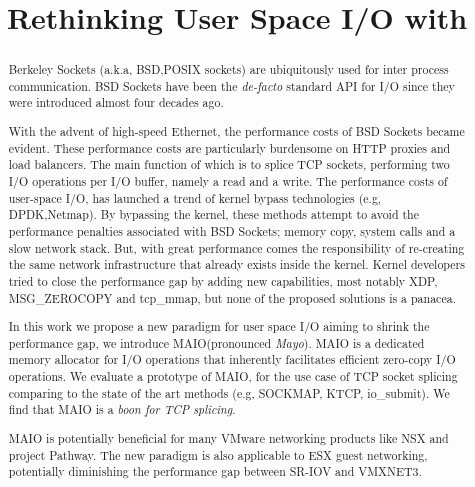 \documentclass[sigconf,9pt]{acmart}
\title{Rethinking User Space I/O with \oursys}
\newcommand{\oursys}{MAIO\xspace}
\newcommand{\sockets}{BSD Sockets\xspace}
\begin{document}
\begin{abstract}
    Berkeley Sockets (a.k.a, BSD,POSIX sockets) are ubiquitously used for inter process communication. \sockets have been the \emph{de-facto} standard API for I/O since they were introduced almost four decades ago. 
    
    With the advent of high-speed Ethernet, the performance costs of \sockets became evident. These performance costs are particularly burdensome on HTTP proxies and load balancers. The main function of which is to splice TCP sockets, performing two I/O operations per I/O buffer, namely a read and a write. The performance costs of user-space I/O, has launched a trend of kernel bypass technologies (e.g, DPDK,Netmap). By bypassing the kernel, these methods attempt to avoid the performance penalties associated with \sockets; memory copy, system calls and a slow network stack. But, with great performance comes the responsibility of re-creating the same network infrastructure that already exists inside the kernel. Kernel developers tried to close the performance gap by adding new capabilities, most notably XDP, MSG\_ZEROCOPY and tcp\_mmap, but none of the proposed solutions is a panacea.
    
    In this work we propose a new paradigm for user space I/O aiming to shrink the performance gap, we introduce \oursys (pronounced \emph{Mayo}). \oursys is a dedicated memory allocator for I/O operations that inherently facilitates efficient zero-copy I/O operations. We evaluate a prototype of \oursys, for the use case of TCP socket splicing comparing to  the state of the art methods (e.g, SOCKMAP, KTCP, io\_submit). We find that \oursys is a \emph{boon for TCP splicing}. 
    
    \oursys is potentially beneficial for many VMware networking products like NSX and project Pathway. The new paradigm is also applicable to ESX guest networking, potentially diminishing the performance gap between SR-IOV and VMXNET3. 
    
    
\end{abstract}
\end{document}
